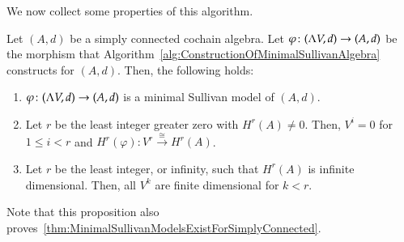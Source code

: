We now collect some properties of this algorithm.
\begin{Proposition}
\label{prop:PropertiesOfAlgorithm}
 Let $(A,d)$ be a simply connected cochain algebra. Let $\varphi \colon (\Lambda V,d) \to (A,d)$ be the morphism that
 Algorithm~\ref{alg:ConstructionOfMinimalSullivanAlgebra} constructs for $(A,d)$. Then, the following  holds:
 \begin{enumerate}
  \item $\varphi \colon (\Lambda V,d) \to (A,d)$ is a minimal Sullivan model of $(A,d)$.
  \item Let $r$ be the least integer greater zero with $H^r(A) \neq 0$. Then, $V^i = 0$ for $1 \leq i < r$ and
    $H^r(\varphi) \colon V^r \overset{\cong}{\to} H^r(A)$.
  \item Let $r$ be the least integer, or infinity, such that $H^r(A)$ is infinite dimensional.  Then,
    all $V^k$ are finite dimensional for $k < r$.
 \end{enumerate}

\end{Proposition}
Note that this proposition also proves~\ref{thm:MinimalSullivanModelsExistForSimplyConnected}.
